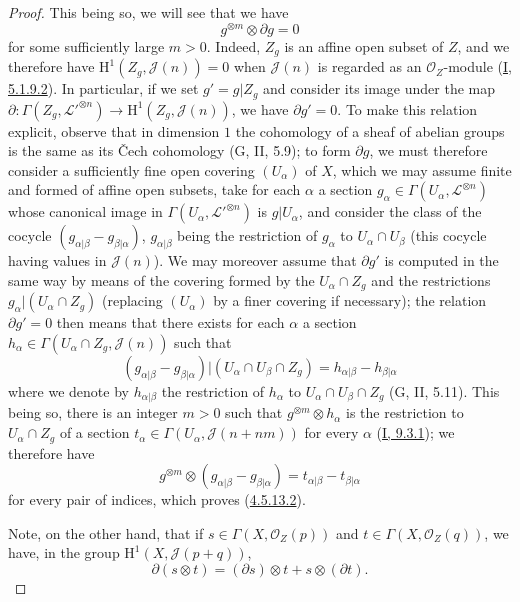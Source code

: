 \begin{proof}
This being so, we will see that we have
\begin{equation}
\label{II.4.5.13.2}
  g^{\otimes m}\otimes\partial g=0
\tag{4.5.13.2}
\end{equation}
for some sufficiently large $m>0$. Indeed, $Z_g$ is an affine open subset of $Z$, and
we therefore have $\mathrm{H}^1(Z_g,\mathcal{J}(n))=0$ when $\mathcal{J}(n)$ is
regarded as an $\mathcal{O}_Z$-module
(\hyperref[I.5.1.9.2]{I, 5.1.9.2}). In particular, if we set
$g'=g|Z_g$ and consider its image under the map
$\partial:\Gamma(Z_g,\mathcal{L}'^{\otimes n})\to
\mathrm{H}^1(Z_g,\mathcal{J}(n))$, we have $\partial g'=0$. To make
this relation explicit, observe that in dimension $1$ the cohomology of a sheaf
of abelian groups is the same as its Čech cohomology (G, II, 5.9);
to form $\partial g$, we must therefore consider a sufficiently fine open covering
$(U_\alpha)$ of $X$, which we may assume finite and formed
of affine open subsets, take for each $\alpha$ a section
$g_\alpha\in\Gamma(U_\alpha,\mathcal{L}^{\otimes n})$ whose canonical
image in $\Gamma(U_\alpha,\mathcal{L}'^{\otimes n})$ is
$g|U_\alpha$, and consider the class of the cocycle
$(g_{\alpha|\beta}-g_{\beta|\alpha})$, $g_{\alpha|\beta}$ being the
restriction of $g_\alpha$ to $U_\alpha\cap U_\beta$ (this cocycle having
values in $\mathcal{J}(n)$). We may moreover assume that $\partial g'$
is computed in the same way by means of the covering formed by the
$U_\alpha\cap Z_g$ and the restrictions $g_\alpha|(U_\alpha\cap Z_g)$
(replacing $(U_\alpha)$ by a finer covering if necessary); the
relation $\partial g'=0$ then means that there exists for each $\alpha$
a section $h_\alpha\in\Gamma(U_\alpha\cap Z_g,\mathcal{J}(n))$ such that
\[
  (g_{\alpha|\beta}-g_{\beta|\alpha})
  |(U_\alpha\cap U_\beta\cap Z_g)
  =h_{\alpha|\beta}-h_{\beta|\alpha}
\]
where we denote by $h_{\alpha|\beta}$ the restriction of $h_\alpha$ to
$U_\alpha\cap U_\beta\cap Z_g$ (G, II, 5.11). This being so, there is an integer
$m>0$ such that $g^{\otimes m}\otimes h_\alpha$ is the restriction to
$U_\alpha\cap Z_g$ of a section
$t_\alpha\in\Gamma(U_\alpha,\mathcal{J}(n+nm))$ for every $\alpha$
(\hyperref[I.9.3.1]{I, 9.3.1}); we therefore have
\[
  g^{\otimes m}\otimes(g_{\alpha|\beta}-g_{\beta|\alpha})
  =t_{\alpha|\beta}-t_{\beta|\alpha}
\]
for every pair of indices, which proves
(\hyperref[II.4.5.13.2]{4.5.13.2}).

Note, on the other hand, that if
$s\in\Gamma(X,\mathcal{O}_Z(p))$ and
$t\in\Gamma(X,\mathcal{O}_Z(q))$, we have, in the group
$\mathrm{H}^1(X,\mathcal{J}(p+q))$,
\begin{equation}
\label{II.4.5.13.3}
  \partial(s\otimes t)=(\partial s)\otimes t+s\otimes(\partial t).
\tag{4.5.13.3}
\end{equation}


\end{proof}
